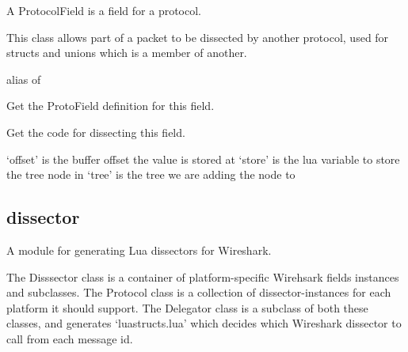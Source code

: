 \documentclass[A4paper,10pt,english]{sphinxmanual}
\begin{document}
\begin{fulllineitems}
\label{devel/code:field.ProtocolField}
A ProtocolField is a field for a protocol.

This class allows part of a packet to be dissected by another
protocol, used for structs and unions which is a member of another.

\begin{fulllineitems}
\label{devel/code:field.ProtocolField.Fake}
alias of 

\end{fulllineitems}


\begin{fulllineitems}
\label{devel/code:field.ProtocolField.get_definition}
Get the ProtoField definition for this field.

\end{fulllineitems}


\begin{fulllineitems}
\label{devel/code:field.ProtocolField.get_code}
Get the code for dissecting this field.

`offset' is the buffer offset the value is stored at
`store' is the lua variable to store the tree node in
`tree' is the tree we are adding the node to

\end{fulllineitems}


\end{fulllineitems}



\subsection{dissector}
\label{devel/code:module-dissector}\label{devel/code:dissector}
A module for generating Lua dissectors for Wireshark.

The Disssector class is a container of platform-specific Wirehsark
fields instances and subclasses. The Protocol class is a collection of
dissector-instances for each platform it should support. The Delegator
class is a subclass of both these classes, and generates `luastructs.lua'
which decides which Wireshark dissector to call from each message id.
\end{document}
